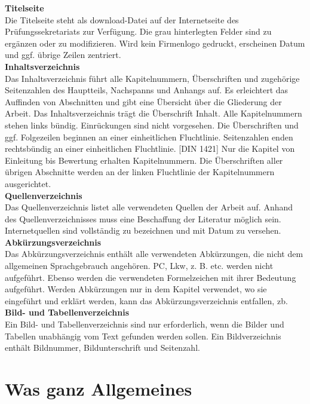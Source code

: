 \textbf{Titelseite}\\
Die Titelseite steht als download-Datei auf der Internetseite des Prüfungssekretariats zur 
Verfügung. Die grau hinterlegten Felder sind zu ergänzen oder zu modifizieren. Wird kein 
Firmenlogo gedruckt, erscheinen Datum und ggf. übrige Zeilen zentriert.\\

\textbf{Inhaltsverzeichnis}\\
Das Inhaltsverzeichnis führt alle Kapitelnummern, Überschriften und zugehörige Seitenzahlen des Hauptteils, Nachspanns und Anhangs auf. Es erleichtert das Auffinden von Abschnitten und gibt eine Übersicht über die Gliederung der Arbeit. Das Inhaltsverzeichnis trägt die Überschrift \glq Inhalt\grq{}. Alle Kapitelnummern stehen links bündig. Einrückungen sind nicht vorgesehen. Die Überschriften und ggf. Folgezeilen beginnen an einer einheitlichen Fluchtlinie. Seitenzahlen enden rechtsbündig an einer einheitlichen Fluchtlinie. [DIN 1421] Nur die Kapitel von Einleitung bis Bewertung erhalten Kapitelnummern. Die Überschriften aller übrigen Abschnitte werden an der linken Fluchtlinie der Kapitelnummern ausgerichtet. \\

\textbf{Quellenverzeichnis}\\
Das Quellenverzeichnis listet alle verwendeten Quellen der Arbeit auf. Anhand des Quellenverzeichnisses muss eine Beschaffung der Literatur möglich sein. Internetquellen sind vollständig zu bezeichnen und mit Datum zu versehen. \\

\textbf{Abkürzungsverzeichnis}\\
Das Abkürzungsverzeichnis enthält alle verwendeten Abkürzungen, die nicht dem allgemeinen Sprachgebrauch angehören. PC, Lkw, z. B. etc. werden nicht aufgeführt. Ebenso werden die verwendeten Formelzeichen mit ihrer Bedeutung aufgeführt. Werden Abkürzungen nur in dem Kapitel verwendet, wo sie eingeführt und erklärt werden, kann das Abkürzungsverzeichnis entfallen, \ac{zb}. \\

\textbf{Bild- und Tabellenverzeichnis}\\
Ein Bild- und Tabellenverzeichnis sind nur erforderlich, wenn die Bilder und Tabellen unabhängig vom Text gefunden werden sollen. Ein Bildverzeichnis enthält Bildnummer, Bildunterschrift und Seitenzahl. 

\newpage

\section{Was ganz Allgemeines}
